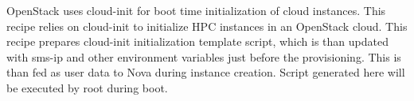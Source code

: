 OpenStack uses cloud-init for boot time initialization of cloud instances. This recipe relies on cloud-init to initialize HPC instances in an OpenStack cloud. This recipe prepares cloud-init initialization template script, which is than updated with sms-ip and other environment variables just before the provisioning. This is than fed as user data to Nova during instance creation. Script generated here will be executed by root during boot.